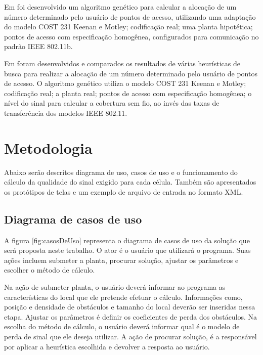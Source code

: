 \documentclass[tc,twoside]{iiufrgs}
\begin{document}
Em \cite{vellasco2010dimensionamento} foi desenvolvido um algoritmo genético para calcular a alocação de um número determinado pelo usuário de pontos de acesso, utilizando uma adaptação do modelo COST 231 Keenan e Motley; codificação real; uma planta hipotética; pontos de acesso com especificação homogênea, configurados para comunicação no padrão IEEE 802.11b.

Em \cite{nagy2012global} foram desenvolvidos e comparados os resultados de várias heurísticas de busca para realizar a alocação de um número determinado pelo usuário de pontos de acesso. O algoritmo genético utiliza o modelo COST 231 Keenan e Motley; codificação real; a planta real; pontos de acesso com especificação homogênea; o nível do sinal para calcular a cobertura sem fio, ao invés das taxas de transferência dos modelos IEEE 802.11.

\chapter{Metodologia} 

Abaixo serão descritos diagrama de uso, casos de uso e o funcionamento do cálculo da qualidade do sinal exigido para cada célula. Também são apresentados os protótipos de telas e um exemplo de arquivo de entrada no formato XML.

\section{Diagrama de casos de uso} 

A figura \ref{fig:casosDeUso} representa o diagrama de casos de uso da solução que será proposta neste trabalho. O ator é o usuário que utilizará o programa. Suas ações incluem submeter a planta, procurar solução, ajustar os parâmetros e escolher o método de cálculo.

Na ação de submeter planta, o usuário deverá informar ao programa as características do local que ele pretende efetuar o cálculo. Informações como, posição e densidade de obstáculos e tamanho do local deverão ser inseridas nessa etapa. Ajustar os parâmetros é definir os coeficientes de perda dos obstáculos. Na escolha do método de cálculo, o usuário deverá informar qual é o modelo de perda de sinal que ele deseja utilizar. A ação de procurar solução, é a responsável por aplicar a heurística escolhida e devolver a resposta ao usuário.
\end{document}
